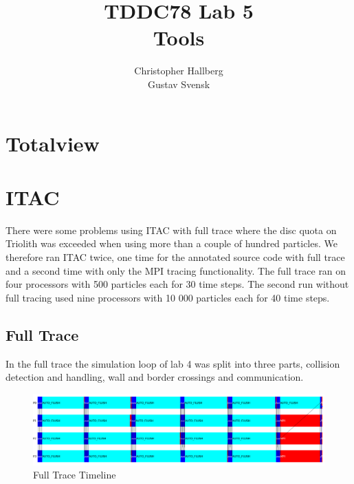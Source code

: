 \documentclass[a4paper, 12pt]{article}
\begin{document}
\title{TDDC78 Lab 5\\
        Tools }
\author{Christopher Hallberg \\
        Gustav Svensk}
\maketitle

\thispagestyle{empty}

\newpage
\setcounter{page}{1}
\tableofcontents
\newpage

\section{Totalview}
\section{ITAC}
There were some problems using ITAC with full trace where the disc quota on Triolith
was exceeded when using more than a couple of hundred particles. We therefore
ran ITAC twice, one time for the annotated source code with full trace and a
second time with only the MPI tracing functionality. The full trace ran on
four processors with 500 particles each for 30 time steps. The second run without
full tracing used nine processors with 10 000 particles each for 40 time steps.

\subsection{Full Trace}
In the full trace the simulation loop of lab 4 was split into three parts,
collision detection and handling, wall and border crossings and communication. 

\begin{figure}[h]
        \centering
        \includegraphics[width=\textwidth]{event_timeline_loop_state.png}
        \caption{Full Trace Timeline}
        \label{fig:ftt}
\end{figure}
\end{document}
